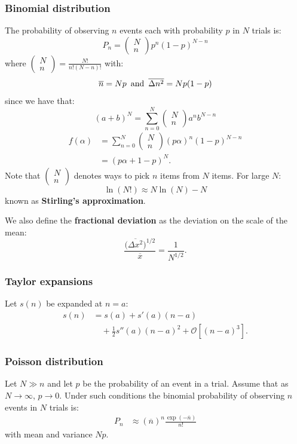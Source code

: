 \documentclass{article}
\begin{document}
\begin{multicols*}{3}
\subsubsection*{Binomial distribution}
The probability of observing $n$ events 
each with probability $p$ in $N$ trials is:
$$P_n=\begin{pmatrix}
N \\ n\end{pmatrix}p^n(1-p)^{N-n}$$
where
$\displaystyle\begin{pmatrix}N \\ n\end{pmatrix}
=\frac{N!}{n!(N-n)!}$ with:
$$\overline{n}=Np
\hspace{0.07in}\text{and}\hspace{0.07in}
\overline{\Delta n^2}=Np(1-p)$$
since we have that:
$$(a+b)^N=\sum_{n=0}^{N}
\begin{pmatrix}N \\ n\end{pmatrix}a^n b^{N-n}$$
\begin{align*}
    f(\alpha)
    &=\sum_{n=0}^{N}\begin{pmatrix}N \\ n\end{pmatrix}
    (p\alpha)^n(1-p)^{N-n} \\
    &=(p\alpha+1-p)^N.
\end{align*}
Note that $\begin{pmatrix}N \\ n\end{pmatrix}$
denotes ways to pick $n$ items 
from $N$ items.
For large $N$:
$$\ln(N!)\approx N\ln(N)-N$$
known as \textbf{Stirling's approximation}.

\newcolumn

We also define the \textbf{fractional deviation}
as the deviation on the scale of the mean:
$$\frac{\bigl(\overline{\Delta x^2}\bigr)^{1/2}}{\overline{x}}
=\frac{1}{N^{1/2}}.$$

\subsubsection*{Taylor expansions}
Let $s(n)$ be expanded at $n=a$:
\begin{align*}
    s(n)&=s(a)+s'(a)(n-a) \\
    &\quad+\frac{1}{2}s''(a)(n-a)^2+\mathcal{O}[(n-a)^3].
\end{align*}

\subsubsection*{Poisson distribution}
Let $N\gg n$ and let $p$ be the probability of 
an event in a trial. Assume that as $N\rightarrow\infty$,
$p\rightarrow0$. Under such conditions
the binomial probability of observing $n$ events 
in $N$ trials is:
\begin{align*}
    P_n
    &\approx(\overline{n})^n\frac{\exp(-\overline{n})}{n!}
\end{align*}
with mean and variance $Np$.


\end{multicols*}
\end{document}
